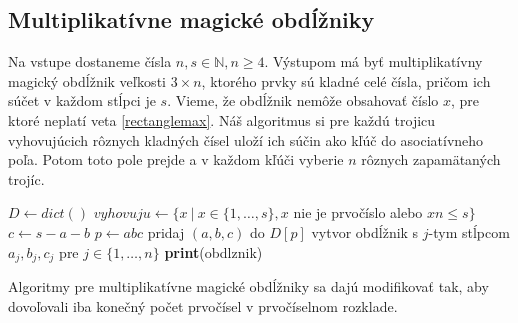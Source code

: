 \subsection{Multiplikatívne magické obdĺžniky}

\begin{alg}
\label{algmmos}
Na vstupe dostaneme čísla $n,s \in \mathbb{N}, n \geq 4$. Výstupom má byť multiplikatívny magický obdĺžnik veľkosti $3 \times n$, ktorého prvky sú kladné celé čísla, pričom ich súčet v každom stĺpci je $s$. Vieme, že obdĺžnik nemôže obsahovať číslo $x$, pre ktoré neplatí veta \ref{rectanglemax}. Náš algoritmus si pre každú trojicu vyhovujúcich rôznych kladných čísel uloží ich súčin ako kľúč do asociatívneho poľa. Potom toto pole prejde a v každom kľúči vyberie $n$ rôznych zapamätaných trojíc.
\end{alg}

\begin{algorithmic}
\STATE $D \gets dict()$
\STATE $vyhovuju \gets \{x ~|~ x \in \{1, \dots , s\}, x$ nie je prvočíslo alebo $xn \leq s\}$
	\STATE $c \gets s-a-b$
		\STATE $p \gets abc$
		\STATE pridaj $(a,b,c)$ do $D[p]$
	\ENDIF
\ENDFOR
{}
				\STATE vytvor obdĺžnik s $j$-tym stĺpcom $a_{j}, b_{j}, c_{j}$ pre $j \in \{1, \dots , n\}$
					\STATE \textbf{print}(obdlznik)
				\ENDIF
			\ENDFOR
		\ENDIF
	\ENDFOR
\ENDFOR
\end{algorithmic}



\begin{note} Algoritmy pre multiplikatívne magické obdĺžniky sa dajú modifikovať tak, aby dovoľovali iba konečný počet prvočísel v prvočíselnom rozklade.
\end{note} 

